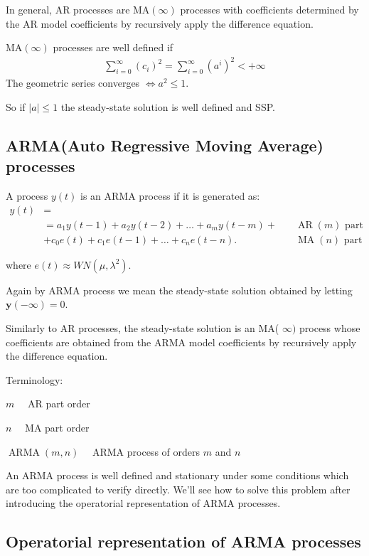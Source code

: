 In general, AR processes are $\mathrm{MA}(\infty)$ processes with coefficients determined by the AR model coefficients by recursively apply the difference equation.

$\mathrm{MA}(\infty)$ processes are well defined if 
\begin{align*}
	\sum_{i=0}^{\infty} \left(c_{i}\right)^2=\sum_{i=0}^{\infty} \left(a^{i}\right)^2< +\infty
\end{align*}
The geometric series converges $\iff a^2\leq 1$.

So if $|a|\leq1$ the steady-state solution is well defined and SSP.

\subsection{ARMA(Auto Regressive Moving Average) processes}

A process $y(t)$ is an ARMA process if it is generated as:
\begin{align*}
	y(t)&=\\
	&=a_{1} y(t-1)+a_{2} y(t-2)+\ldots+a_{m} y(t-m)+\quad &\operatorname{AR}(m) \text{ part}\\ &+c_{0} e(t)+c_{1} e(t-1)+\ldots+c_{n} e(t-n) . \quad &\operatorname{MA}(n) \text{ part}
\end{align*}

where $e(t) \approx W N\left(\mu, \lambda^{2}\right)$.

Again by ARMA process we mean the steady-state solution obtained by letting $\mathbf{y}(-\infty)=0$.
 
 Similarly to AR processes, the steady-state solution is an MA( $\infty)$ process whose coefficients are obtained from the ARMA model coefficients by recursively apply the difference equation.
 
Terminology:

$m \quad$ AR part order

$n \quad$ MA part order

$\operatorname{ARMA}(m, n) \quad$ ARMA process of orders $m$ and $n$

An ARMA process is well defined and stationary under some conditions which are too complicated to verify directly.
We'll see how to solve this problem after introducing the operatorial 
representation of ARMA processes.

\subsection{Operatorial 
	representation of ARMA processes}


